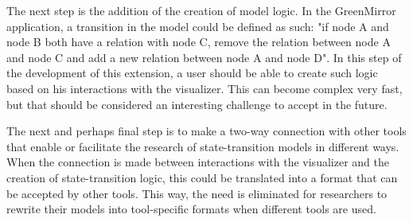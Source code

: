 The next step is the addition of the creation of model logic. In the GreenMirror application, a transition in the model could be defined as such: "if node A and node B both have a relation with node C, remove the relation between node A and node C and add a new relation between node A and node D". In this step of the development of this extension, a user should be able to create such logic based on his interactions with the visualizer. This can become complex very fast, but that should be considered an interesting challenge to accept in the future.

The next and perhaps final step is to make a two-way connection with other tools that enable or facilitate the research of state-transition models in different ways. When the connection is made between interactions with the visualizer and the creation of state-transition logic, this could be translated into a format that can be accepted by other tools. This way, the need is eliminated for researchers to rewrite their models into tool-specific formats when different tools are used.
